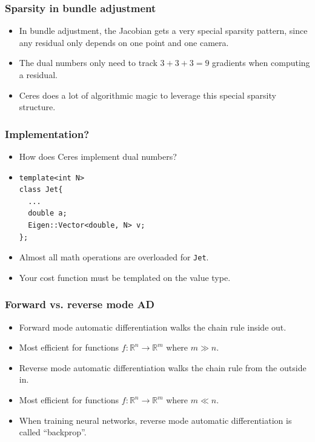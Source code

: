 \documentclass[serif,mathserif]{beamer}
\begin{document}
\begin{frame}
  \frametitle{Sparsity in bundle adjustment}
  \begin{itemize}
  \item In bundle adjustment, the Jacobian gets a very special sparsity pattern,
  since any residual only depends on one point and one camera. \pause
  \item The dual numbers only need to track $3 + 3 +3 = 9$ gradients when computing a residual. \pause
  \item Ceres does a lot of algorithmic magic to leverage this special sparsity structure.
  \end{itemize}
\end{frame}

\begin{frame}[fragile]
  \frametitle{Implementation?}
  \begin{itemize}
  \item How does Ceres implement dual numbers? \pause
  \item 
    \lstset{language=C++}
\begin{lstlisting}
template<int N>
class Jet{
  ...
  double a;
  Eigen::Vector<double, N> v;
};
\end{lstlisting} \pause
  \item Almost all math operations are overloaded for \texttt{Jet}. \pause
  \item Your cost function must be templated on the value type.
  \end{itemize}
\end{frame}

\begin{frame}
  \frametitle{Forward vs. reverse mode AD}
  \begin{itemize}
  \item Forward mode automatic differentiation walks the chain rule inside out. \pause
  \item Most efficient for functions $f : \mathbb{R}^n \rightarrow \mathbb{R}^m$ where $m \gg n$. \pause
  \item Reverse mode automatic differentiation walks the chain rule from the outside in. \pause
  \item Most efficient for functions $f : \mathbb{R}^n \rightarrow \mathbb{R}^m$ where $m \ll n$. \pause
  \item When training neural networks, reverse mode automatic differentiation is called ``backprop''.
  \end{itemize}
\end{frame}
\end{document}
